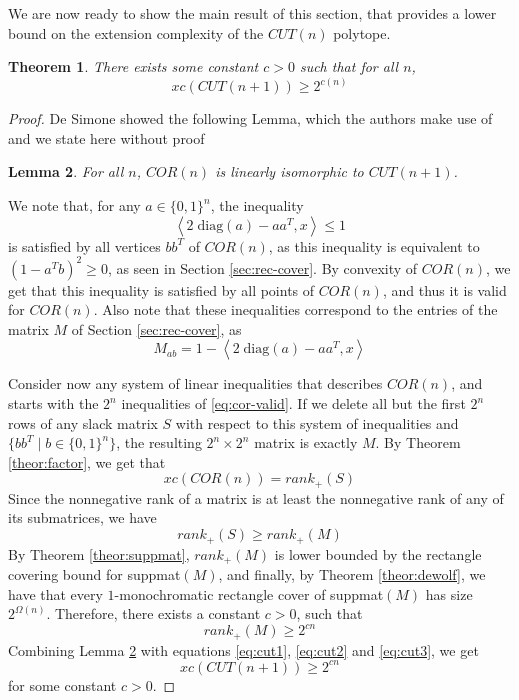 \documentclass{article}
\newtheorem{theorem}{\sc Theorem}
\newtheorem{lemma}[theorem]{\sc Lemma}
\theoremstyle{definition}
\theoremstyle{remark}
\begin{document}
We are now ready to show the main result of this section, that provides a lower bound on the extension complexity of the $CUT(n)$ polytope.

\begin{theorem}\label{theor:cut}
There exists some constant $c > 0$ such that for all $n$,
\[
xc(CUT(n+1)) \geq 2^{c(n)}
\]
\end{theorem}
\begin{proof}
De Simone \cite{de-simone} showed the following Lemma, which the authors make use of and we state here without proof

\begin{lemma}\label{lem:cut-cor}
For all $n$, $COR(n)$ is linearly isomorphic to $CUT(n+1)$.
\end{lemma}

We note that, for any $a \in {\{0, 1\}}^n$, the inequality
\begin{equation}\label{eq:cor-valid}
\left\langle 2 \; \text{diag}(a) - aa^T, x \right\rangle \leq 1
\end{equation}
is satisfied by all vertices $bb^T$ of $COR(n)$, as this inequality is equivalent to ${(1 - a^Tb)}^2 \geq 0$, as seen in Section \ref{sec:rec-cover}. By convexity of $COR(n)$, we get that this inequality is satisfied by all points of $COR(n)$, and thus it is valid for $COR(n)$. Also note that these inequalities correspond to the entries of the matrix $M$ of Section \ref{sec:rec-cover}, as
\[
M_{ab} = 1 - \left\langle 2 \; \text{diag}(a) - aa^T, x \right\rangle
\]

Consider now any system of linear inequalities that describes $COR(n)$, and starts with the $2^n$ inequalities of \eqref{eq:cor-valid}. If we delete all but the first $2^n$ rows of any slack matrix $S$ with respect to this system of inequalities and $\{bb^T \mid b \in {\{0, 1\}}^n \}$, the resulting $2^n \times 2^n$ matrix is exactly $M$. By Theorem \ref{theor:factor}, we get that
\begin{equation}\label{eq:cut1}
xc(COR(n)) = rank_+(S)
\end{equation}
Since the nonnegative rank of a matrix is at least the nonnegative rank of any of its submatrices, we have
\begin{equation}\label{eq:cut2}
rank_+(S) \geq rank_+(M)
\end{equation}
By Theorem \ref{theor:suppmat}, $rank_+(M)$ is lower bounded by the rectangle covering bound for suppmat$(M)$, and finally, by Theorem \ref{theor:dewolf}, we have that every $1$-monochromatic rectangle cover of suppmat$(M)$ has size $2^{\Omega(n)}$. Therefore, there exists a constant $c > 0$, such that
\begin{equation}\label{eq:cut3}
rank_+(M) \geq 2^{cn}
\end{equation}
Combining Lemma \ref{lem:cut-cor} with equations \eqref{eq:cut1}, \eqref{eq:cut2} and \eqref{eq:cut3}, we get
\[
xc(CUT(n+1)) \geq 2^{cn}
\]
for some constant $c > 0$.
\end{proof}
\end{document}
